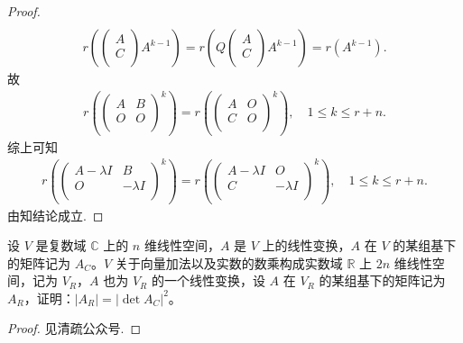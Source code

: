 \documentclass[../../main.tex]{subfiles}%
\begin{document}
\begin{proof}
\begin{align*}
\end{align*}
\begin{align*}
r\left( \left( \begin{array}{c}
A\\
C\\
\end{array} \right) A^{k-1} \right) =r\left( Q\left( \begin{array}{c}
A\\
C\\
\end{array} \right) A^{k-1} \right) =r\left( A^{k-1} \right) .
\end{align*}
故
\begin{align*}
r\left( \left( \begin{matrix}
A&	B\\
O&	O\\
\end{matrix} \right) ^k \right) =r\left( \left( \begin{matrix}
A&	O\\
C&	O\\
\end{matrix} \right) ^k \right) ,\quad 1\leqslant k\leqslant r+n.
\end{align*}
综上可知
\begin{align*}
r\left( \left( \begin{matrix}
A-\lambda I&	B\\
O&	-\lambda I\\
\end{matrix} \right) ^k \right) =r\left( \left( \begin{matrix}
A-\lambda I&	O\\
C&	-\lambda I\\
\end{matrix} \right) ^k \right) ,\quad 1\leqslant k\leqslant r+n.
\end{align*}
由知结论成立.

\end{proof}

\begin{proposition}[复矩阵行列式模长平方等于其实化后实矩阵的行列式]\label{proposition:复矩阵行列式模长平方等于其实化后实矩阵的行列式}
设 \( V \) 是复数域 \( \mathbb{C} \) 上的 \( n \) 维线性空间，\( A\) 是 \( V \) 上的线性变换，\( A \) 在 \( V \) 的某组基下的矩阵记为 \( A_{C} \)。\( V \) 关于向量加法以及实数的数乘构成实数域 \( \mathbb{R} \) 上 \( 2n \) 维线性空间，记为 \( V_{R} \)，\( A \) 也为 \( V_{R} \) 的一个线性变换，设 \( A\) 在 \( V_{R} \) 的某组基下的矩阵记为 \( A_{R} \)，证明：\( |A_{R}| = |\det A_{C}|^{2} \)。
\end{proposition}
\begin{proof}

见清疏公众号.

\end{proof}
\end{document}
